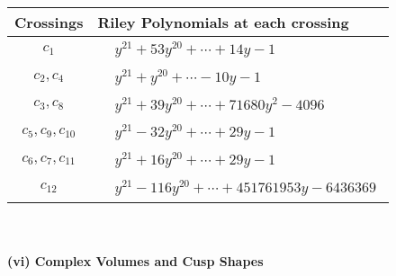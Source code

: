 \documentclass[1p]{elsarticle_modified}
\theoremstyle{definition}
\begin{document}
\begin{tabular}{m{50pt}|m{274pt}}
Crossings & \hspace{64pt}Riley Polynomials at each crossing \\
\hline $$\begin{aligned}c_{1}\end{aligned}$$&$\begin{aligned}
&y^{21}+53 y^{20}+\cdots+14 y-1
\end{aligned}$\\
\hline $$\begin{aligned}c_{2},c_{4}\end{aligned}$$&$\begin{aligned}
&y^{21}+y^{20}+\cdots-10 y-1
\end{aligned}$\\
\hline $$\begin{aligned}c_{3},c_{8}\end{aligned}$$&$\begin{aligned}
&y^{21}+39 y^{20}+\cdots+71680 y^2-4096
\end{aligned}$\\
\hline $$\begin{aligned}c_{5},c_{9},c_{10}\end{aligned}$$&$\begin{aligned}
&y^{21}-32 y^{20}+\cdots+29 y-1
\end{aligned}$\\
\hline $$\begin{aligned}c_{6},c_{7},c_{11}\end{aligned}$$&$\begin{aligned}
&y^{21}+16 y^{20}+\cdots+29 y-1
\end{aligned}$\\
\hline $$\begin{aligned}c_{12}\end{aligned}$$&$\begin{aligned}
&y^{21}-116 y^{20}+\cdots+451761953 y-6436369
\end{aligned}$\\
\hline
\end{tabular}\\~\\
\newpage\flushleft \textbf{(vi) Complex Volumes and Cusp Shapes}
\end{document}
